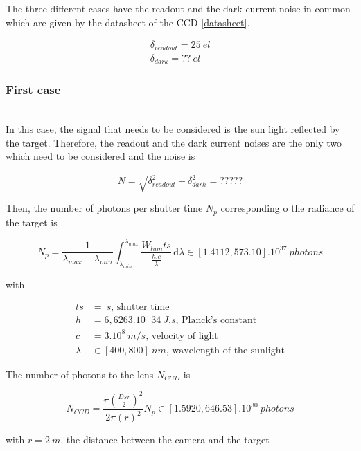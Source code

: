 The three different cases have the readout and the dark current noise in common which are given by the datasheet of the CCD \ref{datasheet}.

\begin{align}
\delta_{readout} = 25 \ el \label{eq:readout} \\
\delta_{dark} = ?? \ el \label{eq:darkcurrent}
\end{align}

\subsubsection{First case}
~\\
In this case, the signal that needs to be considered is the sun light reflected by the target. Therefore, the readout and the dark current noises are the only two which need to be considered and the noise is

\begin{equation}
\label{eq:Noise case1}
N = \sqrt{\delta_{readout}^2+\delta_{dark}^2} = ?????
\end{equation}

Then, the number of photons per shutter time $N_p$ corresponding o the radiance of the target is

\begin{equation}
\label{eq:Number Photons per Shutter Time case1}
N_p = \frac{1}{\lambda_{max}-\lambda_{min}}\int_{\lambda_{min}}^{\lambda_{max}} \frac{W_{lum}ts}{\frac{h.c}{\lambda}} \, \mathrm d\lambda \in [1.4112, 573.10].10^{37} \ photons
\end{equation}

with

\begin{align*}
ts & = \ s \mbox{, shutter time}  \\
h & = 6,6263.10^-34 \ J.s \mbox{, Planck's constant}  \\
c & = 3.10^8 \ m/s \mbox{, velocity of light} \\
\lambda & \in [400, 800] \ nm \mbox{, wavelength of the sunlight}
\end{align*}

The number of photons to the lens $N_{CCD}$ is

\begin{equation}
\label{eq:Number Photons case1}
N_{CCD}=\frac{\pi\left(\frac{Dsr}{2}\right)^2}{2\pi(r)^2}N_p \in [1.5920, 646.53].10^{30} \ photons
\end{equation}

with $r = 2\ m$, the distance between the camera and the target

